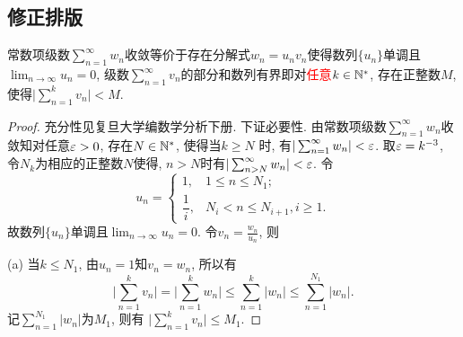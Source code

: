 \documentclass[a4paper,12pt,twoside]{ctexart}
\begin{document}
\subsection{修正排版}
    \begin{theo}\label{theo}
    常数项级数$\sum_{n=1}^{\infty}{w_n}$收敛等价于存在分解式$w_n={u_n}{v_n}$使得数列$\{u_n\}$单调且$\lim_{n\to{\infty}}u_n=0$, 级数$\sum_{n=1}^{\infty}{v_n}$的部分和数列有界即对\textcolor{red}{任意}$k\in{\mathbb N}^*$, 存在正整数$M$, 使得$\vert\sum_{n=1}^{k}{v_n}\vert<M$.
    \end{theo}
    \begin{proof}
        充分性见复旦大学编数学分析下册. 下证必要性. 由常数项级数$\sum_{n=1}^{\infty}{w_n}$收敛知对任意$\varepsilon>0$, 存在$N\in{\mathbb N}^*$, 使得当$k\ge N$ 时, 有$\vert\sum_{n=1}^{\infty}w_n\vert<\varepsilon$. 取$\varepsilon=k^{-3}$, 令$N_k$为相应的正整数$N$使得, $n>N$时有$\vert\sum_{n>N}^\infty w_n\vert<\varepsilon$. 令
        $$u_n=\begin{cases}
            1,&1\le n\le N_1;\\
            \dfrac1i,&N_i<n\le N_{i+1}, i\ge1.
        \end{cases}$$
        故数列$\{u_n\}$单调且$\lim_{n\to{\infty}}u_n=0$. 令$v_n=\frac{w_n}{u_n}$, 则

        (a) 当$k\le N_1$, 由$u_n=1$知$v_n=w_n$, 所以有$$\vert\sum_{n=1}^{k}{v_n}\vert=\vert\sum_{n=1}^{k}{w_n}\vert \le\sum\limits_{n=1}^{k}{\vert{w_n}\vert}\le\sum_{n=1}^{N_1}\vert w_n\vert.$$ 记$\sum_{n=1}^{N_1}\vert w_n\vert$为$M_1$, 则有 $\vert\sum_{n=1}^kv_n\vert\le M_1$.


\end{proof}
\end{document}
